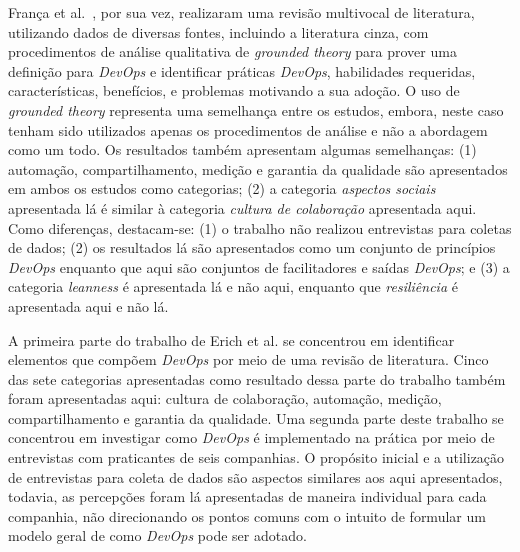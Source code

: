 Fran\c{c}a et al.~\cite{characterizing_devops}, por sua vez, realizaram uma
revisão multivocal de literatura, utilizando dados de diversas fontes, incluindo
a literatura cinza, com procedimentos de análise qualitativa de {\it grounded
theory} para prover uma definição para {\it DevOps} e identificar práticas
{\it DevOps}, habilidades requeridas, características, benefícios, e problemas
motivando a sua adoção. O uso de {\it grounded theory} representa
uma semelhança entre os estudos, embora, neste caso tenham sido utilizados
apenas os procedimentos de análise e não a abordagem como um todo. Os resultados
também apresentam algumas semelhanças: (1) automação, compartilhamento, medição
e garantia da qualidade são apresentados em ambos os estudos como categorias;
(2) a categoria \emph{aspectos sociais} apresentada lá é similar à categoria
\emph{cultura de colaboração} apresentada aqui. Como diferenças, destacam-se:
(1) o trabalho não realizou entrevistas para coletas de dados; (2) os
resultados lá são apresentados como um conjunto de princípios {\it DevOps}
enquanto que aqui são conjuntos de facilitadores e saídas {\it DevOps}; e (3)
a categoria {\it leanness} é apresentada lá e não aqui, enquanto que
\emph{resiliência} é apresentada aqui e não lá.

A primeira parte do trabalho de Erich et al. \cite{qualitative_devops_journalsw_17}
se concentrou em identificar elementos que compõem {\it DevOps} por meio de uma
revisão de literatura. Cinco das sete categorias apresentadas como resultado
dessa parte do trabalho também foram apresentadas aqui: cultura de colaboração,
automação, medição, compartilhamento e garantia da qualidade. Uma segunda parte
deste trabalho se concentrou em investigar como {\it DevOps} é implementado na
prática por meio de entrevistas com praticantes de seis companhias. O propósito
inicial e a utilização de entrevistas para coleta de dados são aspectos similares aos
aqui apresentados, todavia, as percepções foram lá apresentadas de
maneira individual para cada companhia, não direcionando os pontos comuns com o
intuito de formular um modelo geral de como {\it DevOps} pode ser adotado.

